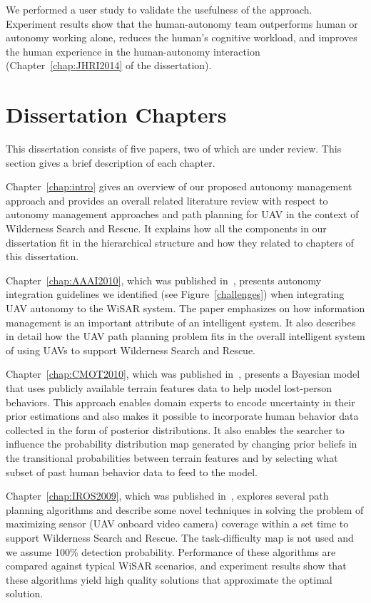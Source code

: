 We performed a user study to validate the usefulness of the approach. Experiment results show that the human-autonomy team outperforms human or autonomy working alone, reduces the human's cognitive workload, and improves the human experience in the human-autonomy interaction (Chapter~\ref{chap:JHRI2014} of the dissertation).


\section{Dissertation Chapters}

This dissertation consists of five papers, two of which are under review. This section gives a brief description of each chapter.

Chapter~\ref{chap:intro} gives an overview of our proposed autonomy management approach and provides an overall related literature review with respect to autonomy management approaches and path planning for UAV in the context of Wilderness Search and Rescue. It explains how all the components in our dissertation fit in the hierarchical structure and how they related to chapters of this dissertation.

Chapter~\ref{chap:AAAI2010}, which was published in~\cite{Lin2010Supporting}, presents autonomy integration guidelines we identified (see Figure~\ref{challenges}) when integrating UAV autonomy to the WiSAR system. The paper emphasizes on how information management is an important attribute of an intelligent system. It also describes in detail how the UAV path planning problem fits in the overall intelligent system of using UAVs to support Wilderness Search and Rescue.

Chapter~\ref{chap:CMOT2010}, which was published in~\cite{Lin2010Bayesian}, presents a Bayesian model that uses publicly available terrain features data to help model lost-person behaviors. This approach enables domain experts to encode uncertainty in their prior estimations and also makes it possible to incorporate human behavior data collected in the form of posterior distributions. It also enables the searcher to influence the probability distribution map generated by changing prior beliefs in the transitional probabilities between terrain features and by selecting what subset of past human behavior data to feed to the model.

Chapter~\ref{chap:IROS2009}, which was published in~\cite{Lin2009UAV}, explores several path planning algorithms and describe some novel techniques in solving the problem of maximizing sensor (UAV onboard video camera) coverage within a set time to support Wilderness Search and Rescue. The task-difficulty map is not used and we assume 100\% detection probability. Performance of these algorithms are compared against typical WiSAR scenarios, and experiment results show that these algorithms yield high quality solutions that approximate the optimal solution.

